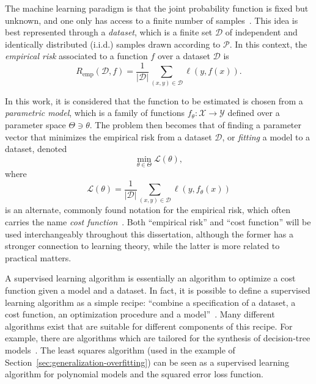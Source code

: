 The machine learning paradigm is that the joint probability function is fixed but unknown, and one only has access to a finite number of samples~\cite{vapnikNatureStatisticalLearning2000}.
This idea is best represented through a \emph{dataset}, which is a finite set $\mathcal{D}$ of independent and identically distributed (i.i.d.) samples drawn according to $\mathcal{P}$.
In this context, the \emph{empirical risk} associated to a function $f$ over a dataset $\mathcal{D}$ is \[
    R_\textrm{emp}(\mathcal{D},f) = \frac{1}{|\mathcal{D}|} \sum_{(x,y)\in \mathcal{D}} \ell(y, f(x))
.\]

In this work, it is considered that the function to be estimated is chosen from a \emph{parametric model}\footnotemark, which is a family of functions $f_\theta: \mathcal{X} \longrightarrow \mathcal{Y}$ defined over a parameter space $\Theta \ni \theta$.
The problem then becomes that of finding a parameter vector that minimizes the empirical risk from a dataset $\mathcal{D}$, or \emph{fitting} a model to a dataset, denoted
\begin{equation}\label{eq:cost-minimization}
    \min_{\theta \in  \Theta} \mathcal{L}(\theta)
,\end{equation}
where
\begin{equation}\label{eq:cost-function}
    \mathcal{L}(\theta) = \frac{1}{|\mathcal{D}|} \sum_{(x,y)\in \mathcal{D}} \ell(y, f_\theta(x))
\end{equation}
is an alternate, commonly found notation for the empirical risk, which often carries the name \emph{cost function}~\cite{murphyMachineLearningProbabilistic2013,Goodfellow-et-al-2016}.
Both ``empirical risk'' and ``cost function'' will be used interchangeably throughout this dissertation, although the former has a stronger connection to learning theory, while the latter is more related to practical matters.

A supervised learning algorithm is essentially an algorithm to optimize a cost function given a model and a dataset.
In fact, it is possible to define a supervised learning algorithm as a simple recipe: ``combine a speciﬁcation of a dataset, a cost function, an optimization procedure and a model''~\cite{Goodfellow-et-al-2016}.
Many different algorithms exist that are suitable for different components of this recipe.
For example, there are algorithms which are tailored for the synthesis of decision-tree models~\cite{breimanClassificationRegressionTrees2017a}.
The least squares algorithm (used in the example of Section~\ref{sec:generalization-overfitting}) can be seen as a supervised learning algorithm for polynomial models and the squared error loss function.


